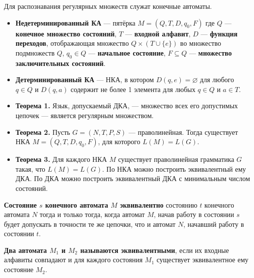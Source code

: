 Для распознавания регулярных множеств служат конечные автоматы.
\begin{itemize}
    \item \textbf{Недетерминированный КА} --- пятёрка $M = (Q, T, D, q_0, F)$ где $Q$ --- \textbf{конечное множество состояний}, $T$ --- \textbf{входной алфавит}, $D$ --- \textbf{функция переходов}, отображающая множество $Q \times (T \cup \{e\})$ во множество подмножеств $Q$, $q_0 \in Q$ --- \textbf{начальное состояние}, $F \subseteq Q$ --- \textbf{множество заключительных состояний}.
    \item \textbf{Детерминированный КА} --- НКА, в котором $D(q, e) = \varnothing$ для любого $q \in Q$ и $D(q, a)$ содержит не более 1 элемента для любых $q \in Q$ и $a \in T$.
    \item \textbf{Теорема 1.}
    Язык, допускаемый ДКА, --- множество всех его допустимых цепочек --- является регулярным множеством.
    \item \textbf{Теорема 2.}
    Пусть $G = (N, T, P, S)$ --- праволинейная.
    Тогда существует НКА $M = (Q, T, D, q_0, F)$, для которого $L(M) = L(G)$.
    \item \textbf{Теорема 3.}
    Для каждого НКА $M$ существует праволинейная грамматика $G$ такая, что $L(M) = L(G)$.
    По НКА можно построить эквивалентный ему ДКА.
    По ДКА можно построить эквивалентный ДКА с минимальным числом состояний.
\end{itemize}


\textbf{Состояние $s$ конечного автомата $M$ эквивалентно} состоянию $t$ конечного автомата $N$ тогда и только тогда, когда автомат $M$, начав работу в состоянии $s$ будет допускать в точности те же цепочки, что и автомат $N$, начавший работу в состоянии $t$.

\textbf{Два автомата $M_1$ и $M_2$ называются эквивалентными}, если их входные алфавиты совпадают и для каждого состояния $M_1$ существует эквивалентное ему состояние $M_2$.


